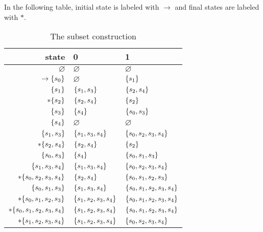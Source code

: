 In the following table, initial state is labeled with \(\rightarrow\) and final states are labeled with \(*\).
\renewcommand{\arraystretch}{1.2}
\begin{table}[h]
\centering
\begin{tabular}[tb]{r||l|l}
   state & 0 & 1 \\
  \hline
  \(\varnothing\) & \(\varnothing\) & \(\varnothing\) \\

  \(\rightarrow \{s_{0}\}\) & \(\varnothing\) & \(\{s_{1}\}\)\\

  \(\{s_{1}\}\) & \(\{s_{1}, s_{3}\}\) & \(\{s_{2}, s_{4}\}\) \\

  \(*\{s_{2}\}\) & \(\{s_{2}, s_{4}\}\) & \(\{s_{2}\}\) \\

  \(\{s_{3}\}\) & \(\{s_{4}\}\) & \(\{s_{0}, s_{3}\}\) \\

  \(\{s_{4}\}\) & \(\varnothing\) & \(\varnothing\) \\

  \(\{s_{1}, s_{3}\}\) & \(\{s_{1}, s_{3}, s_{4}\}\) & \(\{s_{0}, s_{2}, s_{3}, s_{4}\}\) \\

  \(*\{s_{2}, s_{4}\}\) & \(\{s_{2}, s_{4}\}\) & \(\{s_{2}\}\) \\

  \(\{s_{0}, s_{3}\}\) & \(\{s_{4}\}\) & \(\{s_{0}, s_{1}, s_{3}\}\) \\

  \(\{s_{1}, s_{3}, s_{4}\}\) & \(\{s_{1}, s_{3}, s_{4}\}\) & \(\{s_{0}, s_{2}, s_{3}, s_{4}\}\) \\

  \(*\{s_{0}, s_{2}, s_{3}, s_{4}\}\) & \(\{s_{2}, s_{4}\}\) & \(\{s_{0}, s_{1}, s_{2}, s_{3}\}\) \\

  \(\{s_{0}, s_{1}, s_{3}\}\) & \(\{s_{1}, s_{3}, s_{4}\}\) & \(\{s_{0}, s_{1}, s_{2}, s_{3}, s_{4}\}\) \\

  \(*\{s_{0}, s_{1}, s_{2}, s_{3}\}\) & \(\{s_{1}, s_{2}, s_{3}, s_{4}\}\) & \(\{s_{0}, s_{1}, s_{2}, s_{3}, s_{4}\}\) \\

  \(*\{s_{0}, s_{1}, s_{2}, s_{3}, s_{4}\}\) & \(\{s_{1}, s_{2}, s_{3}, s_{4}\}\) & \(\{s_{0}, s_{1}, s_{2}, s_{3}, s_{4}\}\) \\

  \(*\{s_{1}, s_{2}, s_{3}, s_{4}\}\) & \(\{s_{1}, s_{2}, s_{3}, s_{4}\}\) & \(\{s_{0}, s_{2}, s_{3}, s_{4}\}\) \\
\end{tabular}
\caption{The subset construction}
\end{table}
